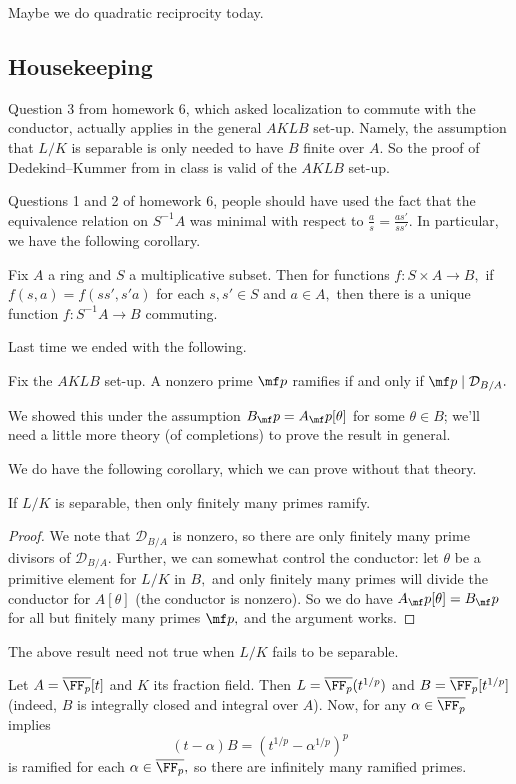 \documentclass[../notes.tex]{subfiles}
\begin{document}














Maybe we do quadratic reciprocity today.

\subsection{Housekeeping}
Question 3 from homework 6, which asked localization to commute with the conductor, actually applies in the general $AKLB$ set-up. Namely, the assumption that $L/K$ is separable is only needed to have $B$ finite over $A.$ So the proof of Dedekind--Kummer from in class is valid of the $AKLB$ set-up.

Questions 1 and 2 of homework 6, people should have used the fact that the equivalence relation on $S^{-1}A$ was minimal with respect to $\frac as=\frac{as'}{ss'}.$ In particular, we have the following corollary.
\begin{corollary}
	Fix $A$ a ring and $S$ a multiplicative subset. Then for functions $f:S\times A\to B,$ if $f(s,a)=f(ss',s'a)$ for each $s,s'\in S$ and $a\in A,$ then there is a unique function $f:S^{-1}A\to B$ commuting.
\end{corollary}

Last time we ended with the following.
\begin{proposition}
	Fix the $AKLB$ set-up. A nonzero prime $\mf p$ ramifies if and only if $\mf p\mid\mathcal D_{B/A}.$
\end{proposition}
We showed this under the assumption $B_\mf p=A_\mf p[\theta]$ for some $\theta\in B$; we'll need a little more theory (of completions) to prove the result in general.

We do have the following corollary, which we can prove without that theory.
\begin{proposition}
	If $L/K$ is separable, then only finitely many primes ramify.
\end{proposition}
\begin{proof}
	We note that $\mathcal D_{B/A}$ is nonzero, so there are only finitely many prime divisors of $\mathcal D_{B/A}.$ Further, we can somewhat control the conductor: let $\theta$ be a primitive element for $L/K$ in $B,$ and only finitely many primes will divide the conductor for $A[\theta]$ (the conductor is nonzero). So we do have $A_\mf p[\theta]=B_\mf p$ for all but finitely many primes $\mf p,$ and the argument works.
\end{proof}
The above result need not true when $L/K$ fails to be separable.
\begin{nex}
	Let $A=\overline{\FF_p}[t]$ and $K$ its fraction field. Then $L=\overline{\FF_p}(t^{1/p})$ and $B=\overline{\FF_p}[t^{1/p}]$ (indeed, $B$ is integrally closed and integral over $A$). Now, for any $\alpha\in\overline{\FF_p}$ implies
	\[(t-\alpha)B=(t^{1/p}-\alpha^{1/p})^p\]
	is ramified for each $\alpha\in\overline{\FF_p},$ so there are infinitely many ramified primes.
\end{nex}
\end{document}
